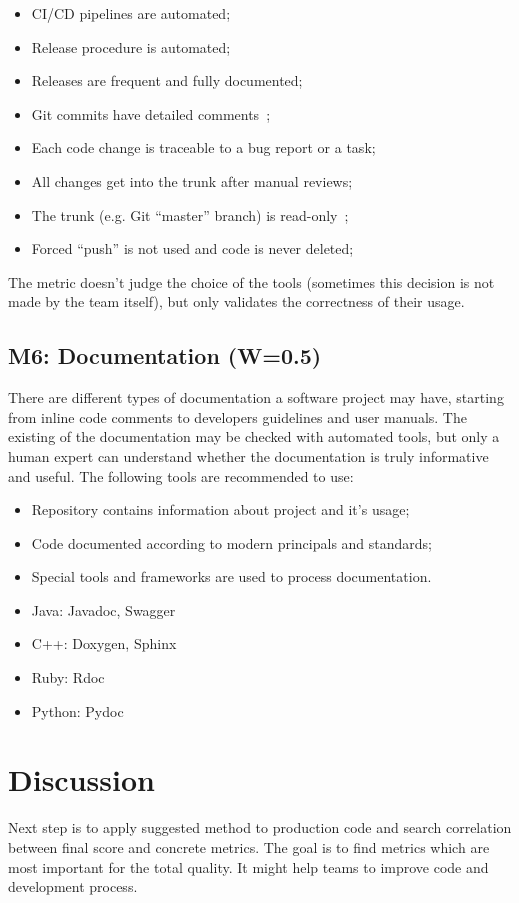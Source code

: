\documentclass[12pt,oneside]{article}
\begin{document}
\begin{itemize}
  \item CI/CD pipelines are automated;
  \item Release procedure is automated;
  \item Releases are frequent and fully documented;
  \item Git commits have detailed comments~\citep[pp.65--66]{loeliger2012git};
  \item Each code change is traceable to a bug report or a task;
  \item All changes get into the trunk after manual reviews;
  \item The trunk (e.g. Git ``master'' branch) is read-only~\citep[pp.65--66]{pidoux2014git};
  \item Forced ``push'' is not used and code is never deleted;
\end{itemize}

The metric doesn't judge the choice of the tools (sometimes this decision
is not made by the team itself), but only validates the correctness
of their usage.

\subsection{M6: Documentation (W=0.5)}

There are different types of documentation a software project may have,
starting from inline code comments to developers guidelines and user manuals.
The existing of the documentation may be checked with automated tools,
but only a human expert can understand whether the documentation is truly
informative and useful. The following tools are recommended to use:

\begin{itemize}
  \item Repository contains information about project and it's usage;
  \item Code documented according to modern principals and standards;
  \item Special tools and frameworks are used to process documentation.
  \item Java: Javadoc, Swagger
  \item C++: Doxygen, Sphinx
  \item Ruby: Rdoc
  \item Python: Pydoc
\end{itemize}

\section{Discussion}
\label{sec:discussion}

Next step is to apply suggested method to production code and search correlation between final score and concrete metrics. The goal is to find metrics which are most important for the total quality. It might help teams to improve code and development process.

\raggedright

\end{document}

